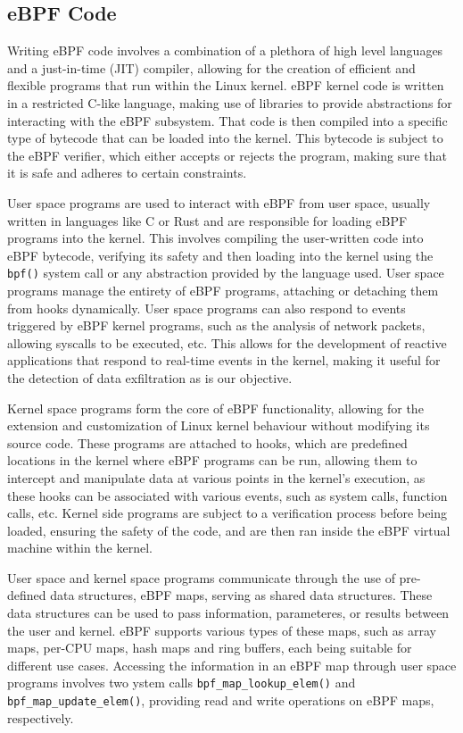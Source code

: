 \subsection{eBPF Code}

Writing eBPF code involves a combination of a plethora of high level languages and a just-in-time (JIT) compiler, allowing for the creation of efficient and flexible programs that run within the Linux kernel. eBPF kernel code is written in a restricted C-like language, making use of libraries to provide abstractions for interacting with the eBPF subsystem. That code is then compiled into a specific type of bytecode that can be loaded into the kernel. This bytecode is subject to the eBPF verifier, which either accepts or rejects the program, making sure that it is safe and adheres to certain constraints. 

User space programs are used to interact with eBPF from user space, usually written in languages like C or Rust and are responsible for loading eBPF programs into the kernel. This involves compiling the user-written code into eBPF bytecode, verifying its safety and then loading into the kernel using the \texttt{bpf()} system call or any abstraction provided by the language used. User space programs manage the entirety of eBPF programs, attaching or detaching them from hooks dynamically. User space programs can also respond to events triggered by eBPF kernel programs, such as the analysis of network packets, allowing syscalls to be executed, etc. This allows for the development of reactive applications that respond to real-time events in the kernel, making it useful for the detection of data exfiltration as is our objective. 

Kernel space programs form the core of eBPF functionality, allowing for the extension and customization of Linux kernel behaviour without modifying its source code. These programs are attached to hooks, which are predefined locations in the kernel where eBPF programs can be run, allowing them to intercept and manipulate data at various points in the kernel's execution, as these hooks can be associated with various events, such as system calls, function calls, etc. Kernel side programs are subject to a verification process before being loaded, ensuring the safety of the code, and are then ran inside the eBPF virtual machine within the kernel. 

User space and kernel space programs communicate through the use of pre-defined data structures, eBPF maps, serving as shared data structures. These data structures can be used to pass information, parameteres, or results between the user and kernel. eBPF supports various types of these maps, such as array maps, per-CPU maps, hash maps and ring buffers, each being suitable for different use cases. Accessing the information in an eBPF map through user space programs involves two ystem calls \texttt{bpf_map_lookup_elem()} and \texttt{bpf_map_update_elem()}, providing read and write operations on eBPF maps, respectively.

